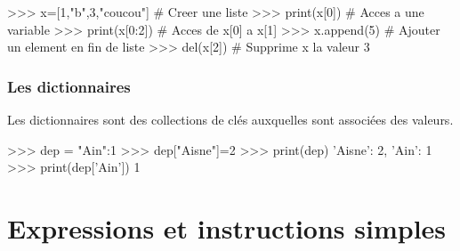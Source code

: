 \documentclass[10pt,fleqn]{article} %
\begin{document}
\begin{exemple}

\begin{minipage}[c]{.6\linewidth}
\begin{py}
\begin{python}
>>> x=[1,"b",3,"coucou"] # Creer une liste
>>> print(x[0]) # Acces a une variable
>>> print(x[0:2]) # Acces de x[0] a x[1]
>>> x.append(5) # Ajouter un element en fin de liste
>>> del(x[2]) # Supprime x la valeur 3
\end{python}
\end{py}
\end{minipage}\hfill
\begin{minipage}[c]{.45\linewidth}
\end{minipage}
\end{exemple}

\subsubsection{Les dictionnaires}
\begin{defi}
Les dictionnaires sont des collections de clés auxquelles sont associées des valeurs. 
\end{defi}

\begin{exemple}
\begin{minipage}[c]{.45\linewidth}
\begin{py}
\begin{python}
>>> dep = {"Ain":1}
>>> dep["Aisne"]=2
>>> print(dep)
	{'Aisne': 2, 'Ain': 1}
>>> print(dep['Ain'])
	1
\end{python}
\end{py}
\end{minipage}\hfill
\begin{minipage}[c]{.45\linewidth}
\end{minipage}
\end{exemple}





\section{Expressions et instructions simples}


\end{document}
